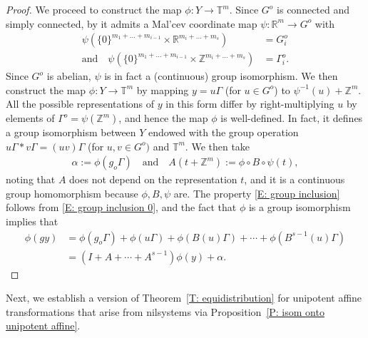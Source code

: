 \documentclass[11pt]{amsart}
\theoremstyle{definition}
\newcommand{\R}{{\mathbb R}}
\newcommand{\T}{{\mathbb T}}
\newcommand{\Z}{{\mathbb Z}}
\newcommand{\inv}{^{-1}}
\newcommand{\1}{{\mathbf{1}}}
\begin{document}
\begin{proof}
We proceed to construct the map $\phi:Y\to\T^m$. Since $G^{o}$ is connected and simply connected, by \cite[Chapter 10, Theorem~18]{HK18} it admits a Mal'cev coordinate map $\psi\colon\R^{m}\to G^{o}$ with
\begin{align*}
    \psi(\{0\}^{m_{1}+\dots+m_{i-1}}\times\R^{m_{i}+\dots+m_{s}})&=G_i^o\\ \textrm{and}\quad \psi(\{0\}^{m_{1}+\dots+m_{i-1}}\times\Z^{m_{i}+\dots+m_{s}}) &= \Gamma^o_i.
\end{align*}
Since $G^o$ is abelian, $\psi$ is in fact a (continuous) group isomorphism.
We then construct the map $\phi: Y\to \T^m$ by mapping $y = u\Gamma$ (for $u\in G^o$) to $\psi\inv(u)+\Z^m$. All the possible representations of $y$ in this form differ by right-multiplying $u$ by elements of $\Gamma^o=\psi(\Z^m)$, and hence the map $\phi$ is well-defined. In fact, it defines a group isomorphism between $Y$ endowed with the group operation $u\Gamma * v\Gamma = (uv)\Gamma$ (for $u,v\in G^o)$ and $\T^m$.
We then take
\begin{align*}
    \alpha:=\phi(g_o \Gamma)\quad \textrm{and}\quad A(t + \Z^m):=\phi \circ B\circ\psi(t),
\end{align*}
noting that $A$ does not depend on the representation $t$, and it is a continuous group homomorphism because $\phi, B, \psi$ are. %
The property \eqref{E: group inclusion} follows from \eqref{E: group inclusion 0}, and the fact that $\phi$ is a group isomorphism implies that
\begin{align*}
    \phi(gy) &= \phi(g_o\Gamma) + \phi(u\Gamma)+\phi(B(u)\Gamma) + \cdots +\phi(B^{s-1}(u) \Gamma)\\
    &= (I+ A + \cdots + A^{s-1})\phi(y) + \alpha.
\end{align*}
 \end{proof}



 Next, we establish a version of Theorem~\ref{T: equidistribution} for unipotent affine transformations that arise from nilsystems via Proposition~\ref{P: isom onto unipotent affine}.
\end{document}
